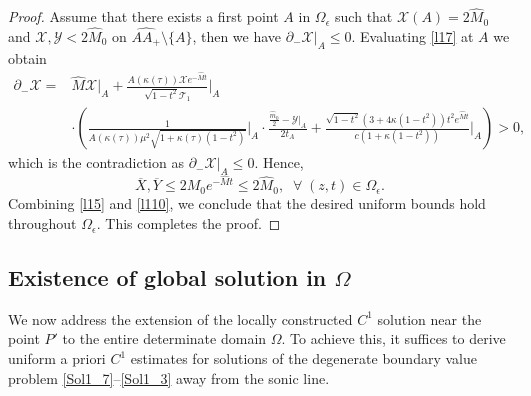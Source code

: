 \documentclass[3p,11pt]{elsarticle}
\numberwithin{equation}{section}
\begin{document}
\begin{proof}
    Assume that there exists a first point $A$ in $\Omega_\epsilon$ such that $\mathcal{X}(A)=2\hat{M}_0$ and $\mathcal{X}, \mathcal{Y}<2\hat M_0$ on $\widehat{AA_+}\setminus\{A\}$, then we have $\partial_-\mathcal{X}|_A\leq 0$.
    Evaluating \eqref{l17} at $A$ we obtain
    \begin{equation*}\label{l19}
         \begin{split}
             \partial_-\mathcal{X} = &\hat M \mathcal{X}|_A+\frac{A(\kappa(\tau))\mathcal{X}e^{-\hat M t}}{\sqrt{1-t^2}\mathcal{T}_1}\Bigg|_A \\ & \cdot\left(\frac{1}{A(\kappa(\tau))\mu^2\sqrt{1+\kappa(\tau)(1-t^2)}}\Bigg|_A\cdot\frac{\frac{\hat m_0}{2}- \mathcal{Y}|_A}{2t_A}+\frac{\sqrt{1-t^2}(3+4\kappa(1-t^2))t^2e^{\hat M t}}{c(1+\kappa(1-t^2))}\Bigg|_A\right)>0,
         \end{split}
     \end{equation*}
     which is the contradiction as $\partial_-\mathcal{X}|_A\leq 0$. Hence,
     \begin{equation}\label{l110}
        \overline{X}, \overline{Y} \leq 2M_0e^{-\hat M t}\leq 2\hat M_0, \;\; \forall \; (z,t)\in \Omega_\epsilon.
    \end{equation}
    Combining \eqref{l15} and \eqref{l110}, we conclude that the desired uniform bounds hold throughout $\Omega_\epsilon$. This completes the proof.
\end{proof}

\subsection{Existence of global solution in $\Omega$}

We now address the extension of the locally constructed $C^{1}$ solution near the point $P'$ to the entire determinate domain $\Omega$. To achieve this, it suffices to derive uniform a priori $C^{1}$ estimates for solutions of the degenerate boundary value problem \eqref{Sol1_7}–\eqref{Sol1_3} away from the sonic line.
\end{document}

